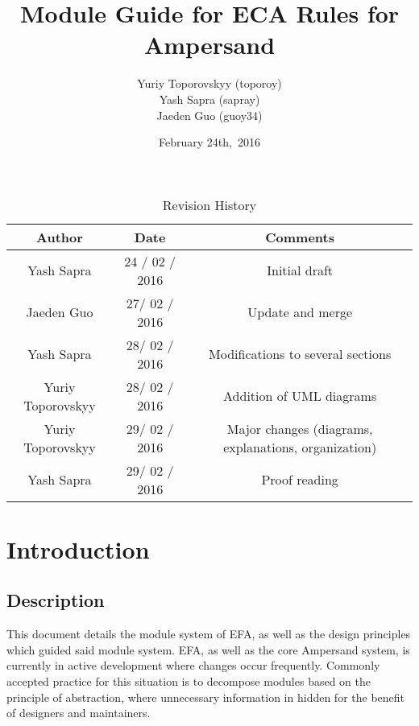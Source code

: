 \documentclass[12pt, svgnames]{article}
\let\Oldsubsection\subsection
\renewcommand{\subsection}{\FloatBarrier\Oldsubsection}
\begin{document}
\title{\vspace*{3cm} Module Guide for ECA Rules for Ampersand} 
\author{Yuriy Toporovskyy (toporoy)\\ Yash Sapra (sapray) \\ Jaeden Guo (guoy34)}
\date{February 24th,\ 2016} 


\maketitle
\newpage
\vspace*{1cm}
\begin{table}[ht!]\begin{center}
        \caption{Revision History}  
        \begin{tabular}{|c|c|c|}\hline
            \textbf{Author} & \textbf{Date} & \textbf{Comments} \\\hline 
            Yash Sapra & 24 / 02 / 2016 & Initial draft\\\hline
	 Jaeden Guo & 27/ 02 / 2016 & Update and merge \\\hline
	 Yash Sapra & 28/ 02 / 2016 & Modifications to several sections \\\hline
	 Yuriy Toporovskyy & 28/ 02 / 2016 & Addition of UML diagrams \\\hline
	 Yuriy Toporovskyy & 29/ 02 / 2016 & Major changes (diagrams, explanations, organization) \\\hline
	 Yash Sapra & 29/ 02 / 2016 & Proof reading \\\hline
        \end{tabular}
    \end{center}\end{table}
\newpage

\tableofcontents

\newpage

\section{Introduction}\label{intro}
\subsection{Description}

This document details the module system of EFA, as well as the design principles
which guided said module system. EFA, as well as the core Ampersand system, is
currently in active development where changes occur frequently. Commonly
accepted practice for this situation is to decompose modules based on the
principle of abstraction, where unnecessary information in hidden for the
benefit of designers and maintainers\citep{modStruct,Parnas1972}.
\end{document}
